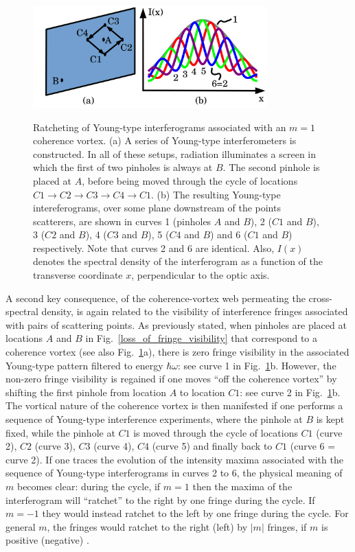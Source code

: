 \documentclass{iucr}              %
\newcommand{\inblue}[1]{{\color{blue}#1}}
\begin{document}
\begin{figure}
\caption{Ratcheting of Young-type interferograms associated with an $m=1$ coherence vortex.  (a) A series of Young-type interferometers is constructed.  In all of these setups, radiation illuminates a screen in which the first of two pinholes is always at $B$.  The second pinhole is placed at $A$, before being moved through the cycle of locations $C1 \rightarrow C2 \rightarrow C3 \rightarrow C4 \rightarrow C1$.  (b) The resulting Young-type intereferograms, over some plane downstream of the points scatterers, are shown in curves 1 (pinholes $A$ and $B$), 2 ($C1$ and $B$), 3 ($C2$ and $B$), 4 ($C3$ and $B$), 5 ($C4$ and $B$) and 6 ($C1$ and $B$) respectively. Note that curves 2 and 6 are identical.  Also, $I(x)$ denotes the spectral density of the interferogram as a function of the transverse coordinate $x$, perpendicular to the optic axis.}
\includegraphics[width=9.0cm]{Figures/Anholonomy.png}
\label{Young_fringe_anholonomy}
\end{figure}

A second key consequence, of the coherence-vortex web permeating the cross-spectral density, is again related to the visibility of interference fringes associated with pairs of scattering points.  As previously stated, when pinholes are placed at locations $A$ and $B$ in \inblue{Fig.~\ref{loss_of_fringe_visibility}} that correspond to a coherence vortex (see also Fig.~\ref{Young_fringe_anholonomy}a), there is zero fringe visibility in the associated Young-type pattern filtered to energy $\hbar \omega$: see curve 1 in \inblue{Fig.~\ref{Young_fringe_anholonomy}b}.  However, the non-zero fringe visibility is regained if one moves ``off the coherence vortex'' by shifting the first pinhole from location $A$ to location $C1$: see curve 2 in \inblue{Fig.~\ref{Young_fringe_anholonomy}b}.  The vortical nature of the coherence vortex is then manifested if one performs a sequence of Young-type interference experiments, where the pinhole at $B$ is kept fixed, while the pinhole at $C1$ is moved through the cycle of locations $C1$ (curve 2), $C2$ (curve 3), $C3$ (curve 4), $C4$ (curve 5) and finally back to $C1$ (curve 6 = curve 2). If one traces the evolution of the intensity maxima associated with the sequence of Young-type interferograms in curves 2 to 6, the physical meaning of $m$ becomes clear: during the cycle, if $m=1$ then the maxima of the interferogram will ``ratchet'' to the right by one fringe during the cycle. If $m=-1$ they would instead ratchet to the left by one fringe during the cycle.  For general $m$, the fringes would ratchet to the right (left) by $|m|$ fringes, if $m$ is positive (negative) \cite{Marasinghe2010}.
\end{document}
